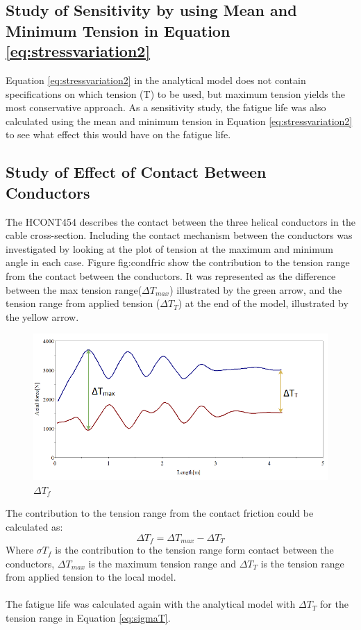\subsection{Study of Sensitivity by using Mean and Minimum Tension in Equation \ref{eq:stressvariation2}}
\label{sec:min}
Equation \ref{eq:stressvariation2}  in the analytical model does not contain specifications on which tension (T) to be used, but maximum tension yields the most conservative approach.  As a sensitivity study, the fatigue life was also calculated using the mean and minimum tension in Equation \ref{eq:stressvariation2} to see what effect this would have on the fatigue life. 
\subsection{Study of Effect of Contact Between Conductors}
The HCONT454 describes the contact between the three helical conductors in the cable cross-section. Including the contact mechanism between the conductors was investigated by looking at the plot of tension at the maximum and minimum angle in each case. Figure {fig:condfric} show the contribution to the tension range from the contact between the conductors. It was represented as the difference between the max tension range($\Delta T_{max}$) illustrated by the green arrow, and the tension range from applied tension ($\Delta T_T$) at the end of the model, illustrated by the yellow arrow.

\begin{figure}[H]
\centering
\includegraphics[scale=0.7]{figures/confric.PNG}
\caption[$\; \:$ $\Delta T_f$]{$\Delta T_f$}
 \label{fig:condfric}
\end{figure}
The contribution to the tension range from the contact friction could be calculated as:
\begin{equation}
    \Delta T_f = \Delta T_{max} - \Delta T_T
\end{equation}
Where $\sigma T_f$ is the contribution to the tension range form contact between the conductors, $\Delta T_{max}$ is the maximum tension range and $\Delta T_T$ is the tension range from applied tension to the local model. \\\\The fatigue life was calculated again with the analytical model with $\Delta T_T$ for the tension range in Equation \ref{eq:sigmaT}.

